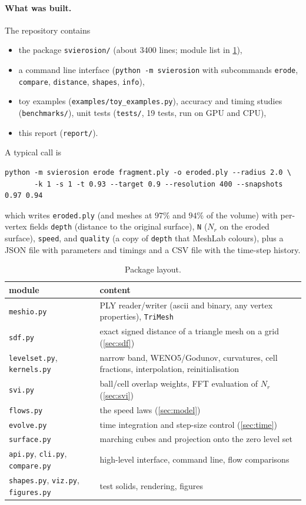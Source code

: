 \documentclass[11pt]{article}
\newcommand{\N}{N_r}
\newcommand{\code}[1]{\texttt{#1}}
\begin{document}
\paragraph{What was built.} The repository contains
\begin{itemize}
\item the package \code{svierosion/} (about 3400 lines; module list in \cref{tab:modules}),
\item a command line interface (\code{python -m svierosion} with subcommands \code{erode},
\code{compare}, \code{distance}, \code{shapes}, \code{info}),
\item toy examples (\code{examples/toy\_examples.py}), accuracy and timing studies
  (\code{benchmarks/}), unit tests (\code{tests/}, 19 tests, run on GPU and CPU),
\item this report (\code{report/}).
\end{itemize}
A typical call is
\begin{verbatim}
python -m svierosion erode fragment.ply -o eroded.ply --radius 2.0 \
       -k 1 -s 1 -t 0.93 --target 0.9 --resolution 400 --snapshots 0.97 0.94
\end{verbatim}
which writes \code{eroded.ply} (and meshes at $97\%$ and $94\%$ of the volume) with per-vertex fields
\code{depth} (distance to the original surface), \code{N} ($\N$ on the eroded surface), \code{speed},
and \code{quality} (a copy of \code{depth} that MeshLab colours), plus a JSON file with parameters and
timings and a CSV file with the time-step history.

\begin{table}[t]
\centering\small
\begin{tabular}{lp{}}
\toprule
module & content\\
\midrule
\code{meshio.py} & PLY reader/writer (ascii and binary, any vertex properties), \code{TriMesh}\\
\code{sdf.py} & exact signed distance of a triangle mesh on a grid (\cref{sec:sdf})\\
\code{levelset.py}, \code{kernels.py} & narrow band, WENO5/Godunov, curvatures, cell fractions,
interpolation, reinitialisation\\
\code{svi.py} & ball/cell overlap weights, FFT evaluation of $\N$ (\cref{sec:svi})\\
\code{flows.py} & the speed laws (\cref{sec:model})\\
\code{evolve.py} & time integration and step-size control (\cref{sec:time})\\
\code{surface.py} & marching cubes and projection onto the zero level set\\
\code{api.py}, \code{cli.py}, \code{compare.py} & high-level interface, command line, flow comparisons\\
\code{shapes.py}, \code{viz.py}, \code{figures.py} & test solids, rendering, figures\\
\bottomrule
\end{tabular}
\caption{Package layout.}\label{tab:modules}
\end{table}
\end{document}
